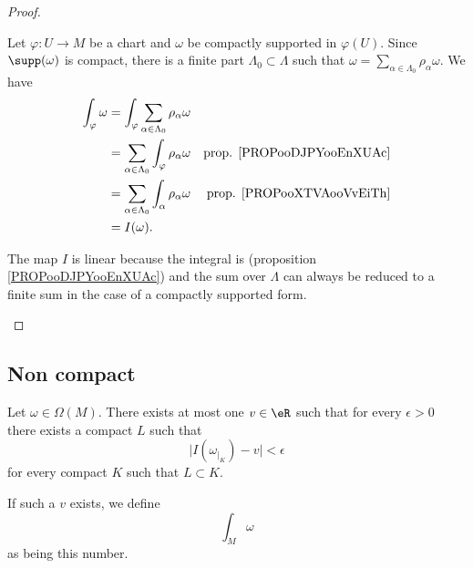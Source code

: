 \begin{proof}
\begin{subproof}
		Let \(\varphi \colon U\to M  \) be a chart and \( \omega\) be compactly supported in \( \varphi(U)\). Since \( \supp(\omega)\) is compact, there is a finite part \( \Lambda_0\subset \Lambda\) such that \( \omega=\sum_{\alpha\in\Lambda_0}\rho_{\alpha}\omega\). We have
		\begin{subequations}
			\begin{align}
				\int_{\varphi}\omega & =\int_{\varphi}\sum_{\alpha\in \Lambda_0}\rho_{\alpha}\omega                                         \\
				                     & =\sum_{\alpha\in\Lambda_0}\int_{\varphi}\rho_{\alpha}\omega  & \text{prop. \ref{PROPooDJPYooEnXUAc}} \\
				                     & = \sum_{\alpha\in\Lambda_0}\int_{\alpha}\rho_{\alpha}\omega  & \text{prop. \ref{PROPooXTVAooVvEiTh}} \\
				                     & = I(\omega).
			\end{align}
		\end{subequations}

		The map \( I\) is linear because the integral is (proposition \ref{PROPooDJPYooEnXUAc}) and the sum over \( \Lambda\) can always be reduced to a finite sum in the case of a compactly supported form.
	\end{subproof}
\end{proof}


\subsection{Non compact}

\begin{propositionDef}	\label{PROPooLCYGooLUxEYS}
	Let \( \omega\in\Omega(M)\). There exists at most one \( v\in \eR\) such that for every \( \epsilon>0\) there exists a compact \( L\) such that
	\begin{equation}
		\big| I(\omega_{|_K})-v \big|<\epsilon
	\end{equation}
	for every compact \( K\) such that \( L\subset K\).

	If such a \( v\) exists, we define
	\begin{equation}
		\int_M\omega
	\end{equation}
	as being this number.
\end{propositionDef}


